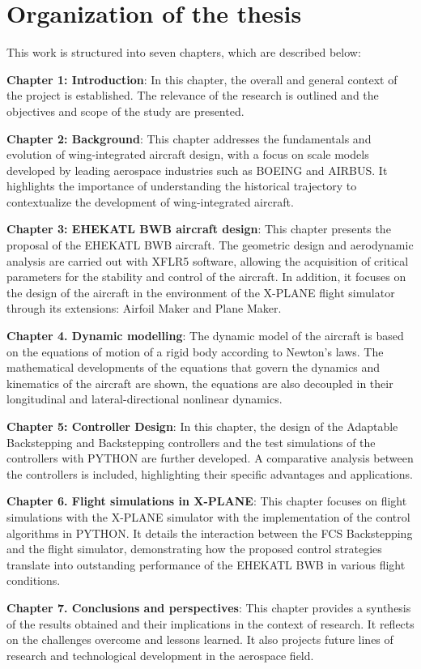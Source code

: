 \section{Organization of the thesis}

This work is structured into seven chapters, which are described below:

\textbf{Chapter 1: Introduction}: In this chapter, the overall and general context of the project is established. The relevance of the research is outlined and the objectives and scope of the study are presented.

\textbf{Chapter 2: Background}: This chapter addresses the fundamentals and evolution of wing-integrated aircraft design, with a focus on scale models developed by leading aerospace industries such as BOEING and AIRBUS. It highlights the importance of understanding the historical trajectory to contextualize the development of wing-integrated aircraft.

\textbf{Chapter 3: EHEKATL BWB aircraft design}: This chapter presents the proposal of the EHEKATL BWB aircraft. The geometric design and aerodynamic analysis are carried out with XFLR5 software, allowing the acquisition of critical parameters for the stability and control of the aircraft. In addition, it focuses on the design of the aircraft in the environment of the X-PLANE flight simulator through its extensions: Airfoil Maker and Plane Maker.

\textbf{Chapter 4. Dynamic modelling}: The dynamic model of the aircraft is based on the equations of motion of a rigid body according to Newton’s laws. The mathematical developments of the equations that govern the dynamics and kinematics of the aircraft are shown, the equations are also decoupled in their longitudinal and lateral-directional nonlinear dynamics.

\textbf{Chapter 5: Controller Design}: In this chapter, the design of the Adaptable Backstepping and Backstepping controllers and the test simulations of the controllers with PYTHON are further developed. A comparative analysis between the controllers is included, highlighting their specific advantages and applications.

\textbf{Chapter 6. Flight simulations in X-PLANE}: This chapter focuses on flight simulations with the X-PLANE simulator with the implementation of the control algorithms in PYTHON. It details the interaction between the FCS Backstepping and the flight simulator, demonstrating how the proposed control strategies translate into outstanding performance of the EHEKATL BWB in various flight conditions.

\textbf{Chapter 7. Conclusions and perspectives}: This chapter provides a synthesis of the results obtained and their implications in the context of research. It reflects on the challenges overcome and lessons learned. It also projects future lines of research and technological development in the aerospace field.


